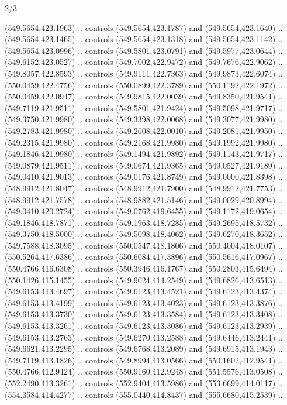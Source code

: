 \begin{flagdescription}{2/3}
\begin{scope}[xshift=0.5\flaglength,yshift=0.5\flagwidth,scale=\flagwidth/495.65]
\begin{scope}[y=0.8pt, x=0.8pt, yscale=-1,shift={(-463.76,-309.78)}]
  (549.5654,423.1963) .. controls (549.5654,423.1787) and (549.5654,423.1640) ..
  (549.5654,423.1465) .. controls (549.5654,423.1318) and (549.5654,423.1142) ..
  (549.5654,423.0996) .. controls (549.5801,423.0791) and (549.5977,423.0644) ..
  (549.6152,423.0527) .. controls (549.7002,422.9472) and (549.7676,422.9062) ..
  (549.8057,422.8593) .. controls (549.9111,422.7363) and (549.9873,422.6074) ..
  (550.0459,422.4756) .. controls (550.0899,422.3789) and (550.1192,422.1972) ..
  (550.0459,422.0947) .. controls (549.9815,422.0039) and (549.8350,421.9541) ..
  (549.7119,421.9511) .. controls (549.5801,421.9424) and (549.5098,421.9717) ..
  (549.3750,421.9980) .. controls (549.3398,422.0068) and (549.3077,421.9980) ..
  (549.2783,421.9980) .. controls (549.2608,422.0010) and (549.2081,421.9950) ..
  (549.2315,421.9980) .. controls (549.2168,421.9980) and (549.1992,421.9980) ..
  (549.1846,421.9980) .. controls (549.1494,421.9892) and (549.1143,421.9717) ..
  (549.0879,421.9511) .. controls (549.0674,421.9365) and (549.0527,421.9189) ..
  (549.0410,421.9013) .. controls (549.0176,421.8749) and (549.0000,421.8398) ..
  (548.9912,421.8047) .. controls (548.9912,421.7900) and (548.9912,421.7753) ..
  (548.9912,421.7578) .. controls (548.9882,421.5146) and (549.0029,420.8994) ..
  (549.0410,420.2724) .. controls (549.0762,419.6455) and (549.1172,419.0654) ..
  (549.1846,418.7871) .. controls (549.1963,418.7285) and (549.2695,418.5732) ..
  (549.3750,418.5000) .. controls (549.5098,418.4062) and (549.6270,418.3652) ..
  (549.7588,418.3095) .. controls (550.0547,418.1806) and (550.4004,418.0107) ..
  (550.5264,417.6386) .. controls (550.6084,417.3896) and (550.5616,417.0967) ..
  (550.4766,416.6308) .. controls (550.3946,416.1767) and (550.2803,415.6494) ..
  (550.1426,415.1455) .. controls (549.9024,414.2549) and (549.6826,413.6513) ..
  (549.6153,413.4697) .. controls (549.6123,413.4521) and (549.6123,413.4374) ..
  (549.6153,413.4199) .. controls (549.6123,413.4023) and (549.6123,413.3876) ..
  (549.6153,413.3730) .. controls (549.6123,413.3584) and (549.6123,413.3408) ..
  (549.6153,413.3261) .. controls (549.6123,413.3086) and (549.6123,413.2939) ..
  (549.6153,413.2763) .. controls (549.6270,413.2588) and (549.6446,413.2441) ..
  (549.6621,413.2295) .. controls (549.6768,413.2089) and (549.6915,413.1943) ..
  (549.7119,413.1826) .. controls (549.8994,413.0566) and (550.1602,412.9541) ..
  (550.4766,412.9424) .. controls (550.9160,412.9248) and (551.5576,413.0508) ..
  (552.2490,413.3261) .. controls (552.9404,413.5986) and (553.6699,414.0117) ..
  (554.3584,414.4277) .. controls (555.0440,414.8437) and (555.6680,415.2539) ..

\end{scope}
\end{scope}
\end{flagdescription}

